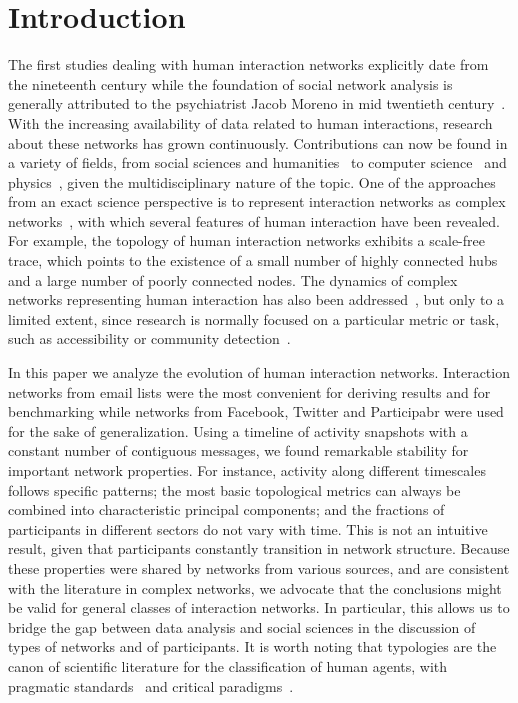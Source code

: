 \documentclass[%
aip,
jmp,%
amsmath,amssymb,
reprint,%
]{revtex4-1}
\begin{document}
\section{Introduction}\label{sec:into}
The first studies dealing with human interaction networks explicitly
date from the nineteenth century while the foundation of
social network analysis is generally attributed to the psychiatrist Jacob Moreno in mid twentieth century~\cite{moreno,newmanBook}. With the increasing availability of data related to human interactions, research about these networks has grown continuously. Contributions can now be found in a variety of fields, from social sciences and humanities~\cite{latour2013} to computer science~\cite{bird} and physics~\cite{barabasiHumanDyn,newmanFriendship}, given the multidisciplinary nature of the topic. One of the approaches from an exact science perspective is to represent interaction networks as complex networks~\cite{barabasiHumanDyn,newmanFriendship}, with which 
several features of human interaction have been revealed. For example, the topology of human interaction networks exhibits a scale-free trace, which points to the existence of a small number of highly connected hubs and a large number of poorly connected nodes. The dynamics of complex networks representing human interaction has also been addressed~\cite{barabasiEvo,newmanEvolving}, but only to a limited extent, since research is normally focused on a particular metric or task, such as accessibility or community detection~\cite{access,newmanModularity}. 

In this paper we analyze the evolution of human interaction networks.
Interaction networks from email lists were the most convenient for deriving results and for benchmarking while networks from Facebook, Twitter and Participabr were used for the sake of generalization.
Using a timeline of activity snapshots with a constant number of contiguous messages, we found remarkable stability for important network properties. For instance, activity along different timescales follows specific patterns; the most basic topological metrics can always be combined into characteristic principal components; and the fractions of participants in different sectors do not vary with time. This is not an intuitive result, given that participants constantly transition in network structure. Because these properties were shared by networks from various sources, and are consistent with the literature in complex networks, we advocate that the conclusions might be valid for general classes of interaction networks. In particular, this allows us to 
bridge the gap between data analysis and social sciences in the discussion of types of networks and of participants.
It is worth noting that typologies are the canon of scientific literature for the classification of human agents, with pragmatic standards~\cite{myers} and critical paradigms~\cite{adorno,typCanon}. 
\end{document}
